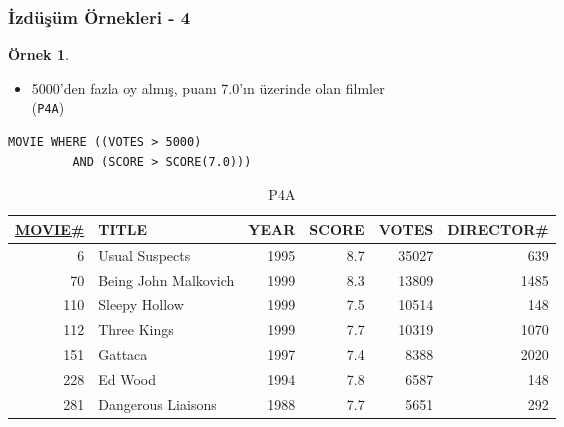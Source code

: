 \documentclass[dvipsnames]{beamer}
\theoremstyle{definition}
\theoremstyle{example}
\newtheorem{ornek}[theorem]{Örnek}
\theoremstyle{plain}
\begin{document}
\begin{frame}[fragile]
  \frametitle{İzdüşüm Örnekleri - 4}

  \begin{ornek}
    \begin{itemize}
      \item 5000'den fazla oy almış, puanı 7.0'ın üzerinde olan filmler\\
        (\texttt{P4A})
    \end{itemize}

    \begin{lstlisting}
MOVIE WHERE ((VOTES > 5000)
         AND (SCORE > SCORE(7.0)))
    \end{lstlisting}

    \pause
    \vspace{-10pt}
    \begin{tiny}
    \begin{table}
      \caption{P4A}
      \begin{tabular}{|r|l|r|r|r|r|}\hline
\underline{MOVIE\#} & TITLE & YEAR & SCORE & VOTES & DIRECTOR\#\\[2pt]\hline\hline
   6 & Usual Suspects       & 1995 &   8.7 & 35027 &        639\\\hline
  70 & Being John Malkovich & 1999 &   8.3 & 13809 &       1485\\\hline
 110 & Sleepy Hollow        & 1999 &   7.5 & 10514 &        148\\\hline
 112 & Three Kings          & 1999 &   7.7 & 10319 &       1070\\\hline
 151 & Gattaca              & 1997 &   7.4 &  8388 &       2020\\\hline
 228 & Ed Wood              & 1994 &   7.8 &  6587 &        148\\\hline
 281 & Dangerous Liaisons   & 1988 &   7.7 &  5651 &        292\\\hline
      \end{tabular}
    \end{table}
    \end{tiny}
  \end{ornek}
\end{frame}
\end{document}

